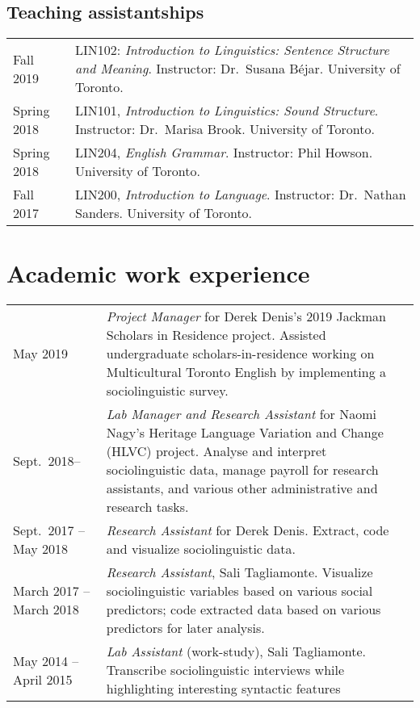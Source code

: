 \documentclass[letterpaper]{article}
\begin{document}
\subsection*{Teaching assistantships}

\begin{tabular}{p{}p{}}
    Fall 2019 & LIN102: \emph{Introduction to Linguistics: Sentence Structure
    and Meaning}. Instructor: Dr.~Susana B\'ejar. University of Toronto. \\
    Spring 2018 & LIN101, \emph{Introduction to Linguistics: Sound Structure}.
    Instructor: Dr.~Marisa Brook. University of Toronto. \\
    Spring 2018 & LIN204, \emph{English Grammar}. Instructor: Phil Howson.
    University of Toronto. \\
    Fall 2017 & LIN200, \emph{Introduction to Language}. Instructor: Dr.~Nathan
    Sanders. University of Toronto. \\
\end{tabular}


\section*{Academic work experience}


\begin{tabular}{p{}p{}}
    May 2019 & \textit{Project Manager} for Derek Denis's 2019 Jackman
    Scholars in Residence project.
    Assisted undergraduate scholars-in-residence working on Multicultural
    Toronto English by implementing a sociolinguistic survey. \\

    Sept.\ 2018-- & \textit{Lab Manager and Research Assistant} for Naomi
    Nagy's Heritage Language Variation and Change (HLVC) project.
    Analyse and interpret sociolinguistic data,
    manage payroll for research assistants,
    and various other administrative and research tasks. \\

    Sept.\ 2017 -- May 2018 & \textit{Research Assistant} for Derek Denis.
    Extract, code and visualize sociolinguistic data. \\

    March 2017 -- March 2018 & \textit{Research Assistant}, Sali Tagliamonte.
    Visualize sociolinguistic variables based on various social predictors; code
    extracted data based on various predictors for later analysis. \\

    May 2014 -- April 2015 & \textit{Lab Assistant} (work-study), Sali
    Tagliamonte.
    Transcribe sociolinguistic interviews while highlighting
    interesting syntactic features
\end{tabular}
\end{document}
